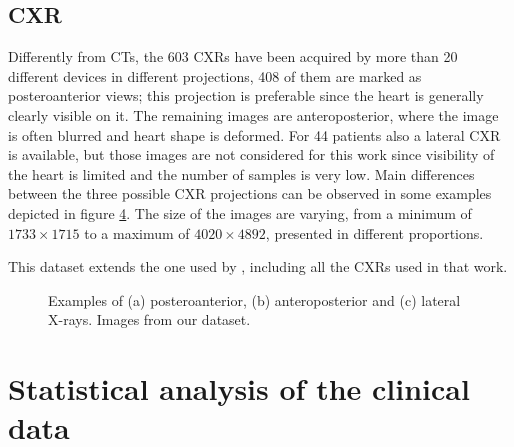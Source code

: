 \subsection{CXR}

Differently from CTs, the 603 CXRs have been acquired by more than 20 different devices in different projections, 408 of them are marked as posteroanterior views; this projection is preferable since the heart is generally clearly visible on it.
The remaining images are anteroposterior, where the image is often blurred and heart shape is deformed.
For 44 patients also a lateral CXR is available, but those images are not considered for this work since visibility of the heart is limited and the number of samples is very low.
Main differences between the three possible CXR projections can be observed in some examples depicted in figure \ref{fig:cxr_example}.
The size of the images are varying, from a minimum of $1733\times1715$ to a maximum of $4020\times4892$, presented in different proportions.

This dataset extends the one used by \cite{iodice_2022}, including all the CXRs used in that work.

\begin{figure}
    \centering
    \begin{subfigure}[b]{0.3\textwidth}
        \caption{}
        \label{subfig:cxr_example_pa}
    \end{subfigure}\hspace{1em}
    \begin{subfigure}[b]{0.3\textwidth}
        \caption{}
        \label{subfig:cxr_example_ap}
    \end{subfigure}\hspace{1em}
    \begin{subfigure}[b]{0.3\textwidth}
        \caption{}
        \label{subfig:cxr_example_lat}
    \end{subfigure}
    
    \caption{Examples of (a) posteroanterior, (b) anteroposterior and (c) lateral X-rays.
             Images from our dataset.}
    \label{fig:cxr_example}
\end{figure}


\section{Statistical analysis of the clinical data}\label{sec:dataset_distribution}

